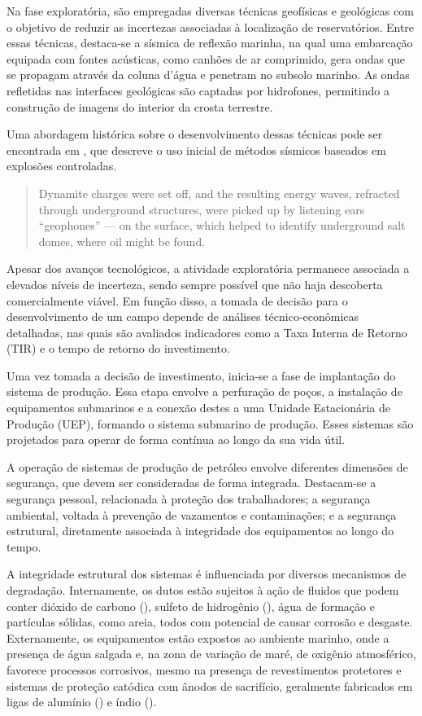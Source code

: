 \documentclass[a4paper,12pt]{article}
\begin{document}
Na fase exploratória, são empregadas diversas técnicas geofísicas e geológicas com o objetivo de reduzir as incertezas associadas à localização de reservatórios. Entre essas técnicas, destaca-se a sísmica de reflexão marinha, na qual uma embarcação equipada com fontes acústicas, como canhões de ar comprimido, gera ondas que se propagam através da coluna d’água e penetram no subsolo marinho. As ondas refletidas nas interfaces geológicas são captadas por hidrofones, permitindo a construção de imagens do interior da crosta terrestre.

Uma abordagem histórica sobre o desenvolvimento dessas técnicas pode ser encontrada em \textcite{yergin1992prize}, que descreve o uso inicial de métodos sísmicos baseados em explosões controladas.

\begin{quotation}
Dynamite charges were set off, and the resulting energy waves, refracted through underground structures, were picked up by listening ears ``geophones'' — on the surface, which helped to identify underground salt domes, where oil might be found.
\end{quotation}

Apesar dos avanços tecnológicos, a atividade exploratória permanece associada a elevados níveis de incerteza, sendo sempre possível que não haja descoberta comercialmente viável. Em função disso, a tomada de decisão para o desenvolvimento de um campo depende de análises técnico-econômicas detalhadas, nas quais são avaliados indicadores como a Taxa Interna de Retorno (TIR) e o tempo de retorno do investimento.

Uma vez tomada a decisão de investimento, inicia-se a fase de implantação do sistema de produção. Essa etapa envolve a perfuração de poços, a instalação de equipamentos submarinos e a conexão destes a uma Unidade Estacionária de Produção (UEP), formando o sistema submarino de produção. Esses sistemas são projetados para operar de forma contínua ao longo da sua vida útil.

A operação de sistemas de produção de petróleo envolve diferentes dimensões de segurança, que devem ser consideradas de forma integrada. Destacam-se a segurança pessoal, relacionada à proteção dos trabalhadores; a segurança ambiental, voltada à prevenção de vazamentos e contaminações; e a segurança estrutural, diretamente associada à integridade dos equipamentos ao longo do tempo.

A integridade estrutural dos sistemas é influenciada por diversos mecanismos de degradação. Internamente, os dutos estão sujeitos à ação de fluidos que podem conter dióxido de carbono (), sulfeto de hidrogênio (), água de formação e partículas sólidas, como areia, todos com potencial de causar corrosão e desgaste. Externamente, os equipamentos estão expostos ao ambiente marinho, onde a presença de água salgada e, na zona de variação de maré, de oxigênio atmosférico, favorece processos corrosivos, mesmo na presença de revestimentos protetores e sistemas de proteção catódica com ânodos de sacrifício, geralmente fabricados em ligas de alumínio () e índio ().
\end{document}
